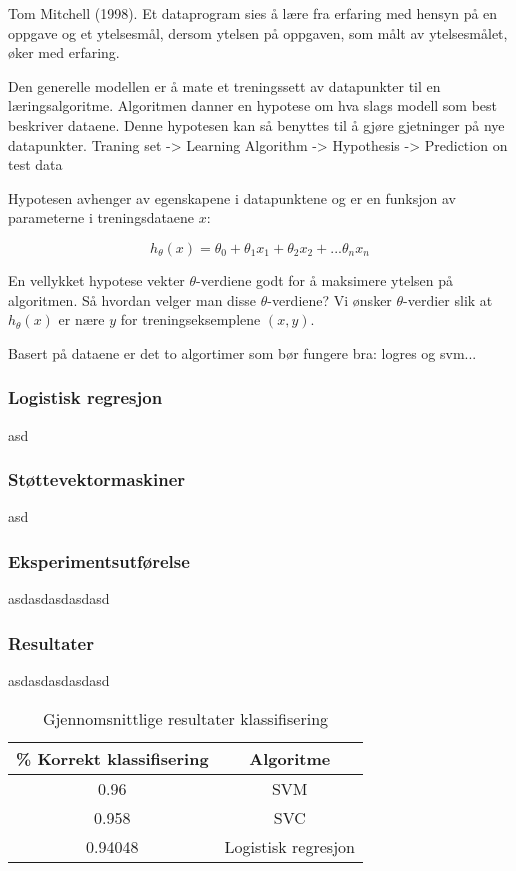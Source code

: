 Tom Mitchell (1998). Et dataprogram sies å lære fra erfaring med hensyn på en oppgave og et ytelsesmål, dersom ytelsen på oppgaven, som målt av ytelsesmålet, øker med erfaring.

Den generelle modellen er å mate et treningssett av datapunkter til en læringsalgoritme. Algoritmen danner en hypotese om hva slags modell som best beskriver dataene. Denne hypotesen kan så benyttes til å gjøre gjetninger på nye datapunkter.
{\color{red} Traning set -> Learning Algorithm -> Hypothesis -> Prediction on test data}

Hypotesen avhenger av egenskapene i datapunktene og er en funksjon av parameterne i treningsdataene $x$:

\[ h_\theta(x) = \theta_0 + \theta_1x_1 + \theta_2x_2 + ... \theta_nx_n\]

En vellykket hypotese vekter $\theta$-verdiene godt for å maksimere ytelsen på algoritmen. Så hvordan velger man disse $\theta$-verdiene? Vi ønsker $\theta$-verdier slik at \(h_\theta(x)\) er nære $y$ for treningseksemplene \((x,y)\).

{\color{red} Basert på dataene er det to algortimer som bør fungere bra: logres og svm...}

\subsubsection{Logistisk regresjon}
asd

\subsubsection{Støttevektormaskiner}
asd

\subsubsection{Eksperimentsutførelse}
asdasdasdasdasd

\subsubsection{Resultater}
asdasdasdasdasd

\begin{table}[h!]
\centering
\begin{tabular}{|| c c ||}
\hline
\% Korrekt klassifisering & Algoritme \\ [0.5ex] 
 \hline\hline
 0.96 & SVM \\ 
 \hline
 0.958 & SVC \\
 \hline
 0.94048 & Logistisk regresjon \\ [1ex]
 \hline
\end{tabular}
\caption{Gjennomsnittlige resultater klassifisering}
\label{table:results}
\end{table}


